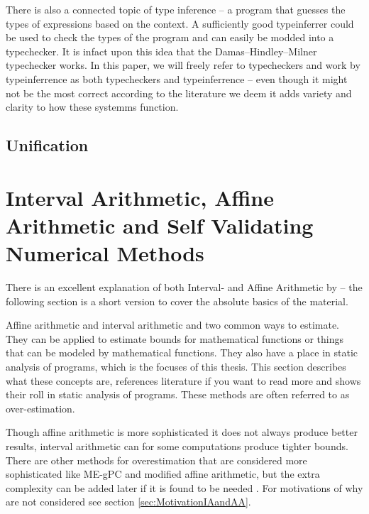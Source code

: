 \documentclass[msc,lith,english]{liuthesis}
\begin{document}
There is also a connected topic of type inference -- a program that guesses the types of expressions based on the context. A sufficiently good typeinferrer could be used to check the types of the program and can easily be modded into a typechecker. It is infact upon this idea that the Damas–Hindley–Milner typechecker works. In this paper, we will freely refer to typecheckers and work by typeinferrence as both typecheckers and typeinferrence -- even though it might not be the most correct according to the literature we deem it adds variety and clarity to how these systemms function.

\subsection{Unification}

\section{Interval Arithmetic, Affine Arithmetic and Self Validating Numerical Methods}
\label{sec:IAandAA}

There is an excellent explanation of both Interval- and Affine Arithmetic by \citeauthor{src:affAri} -- the following section is a short version to cover the absolute basics of the material.

Affine arithmetic and interval arithmetic and two common ways to estimate. They can be applied to estimate bounds for mathematical functions or things that can be modeled by mathematical functions. They also have a place in static analysis of programs, which is the focuses of this thesis. This section describes what these concepts are, references literature if you want to read more and shows their roll in static analysis of programs. These methods are often referred to as over-estimation.

Though affine arithmetic is more sophisticated it does not always produce better results, interval arithmetic can for some computations produce tighter bounds. There are other methods for overestimation that are considered more sophisticated like ME-gPC and modified affine arithmetic, but the extra complexity can be added later if it is found to be needed \cite{src:MEgPC}. For motivations of why are not considered see section \ref{sec:MotivationIAandAA}.
\end{document}

